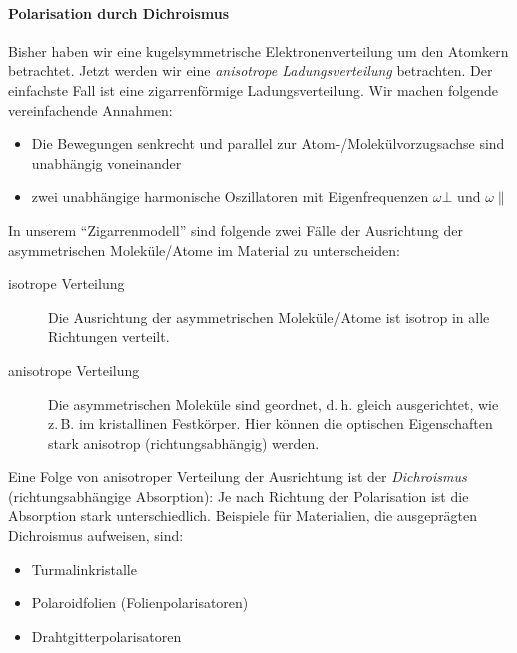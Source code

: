 
\paragraph{Polarisation durch Dichroismus}
Bisher haben wir eine kugelsymmetrische Elektronenverteilung um den
Atomkern betrachtet. Jetzt werden wir eine \emph{anisotrope
Ladungsverteilung} betrachten. Der einfachste Fall ist eine
zigarrenförmige Ladungsverteilung.
Wir machen folgende vereinfachende Annahmen:
\begin{itemize}
\item Die Bewegungen senkrecht und parallel zur
  Atom-/Molekülvorzugsachse sind unabhängig voneinander 
\item zwei unabhängige harmonische Oszillatoren mit Eigenfrequenzen
$\omega\bot$%
und $\omega\parallel$%
\end{itemize}
In unserem \enquote{Zigarrenmodell} sind folgende zwei Fälle der
Ausrichtung der asymmetrischen Moleküle/Atome im Material zu
unterscheiden:
\begin{description}
\item[isotrope Verteilung] Die Ausrichtung der asymmetrischen
  Moleküle/Atome ist isotrop in alle Richtungen verteilt.
\item[anisotrope Verteilung] Die asymmetrischen Moleküle
  sind geordnet, d.\,h. gleich ausgerichtet, wie z.\,B. im
  kristallinen Festkörper. Hier können die optischen Eigenschaften
  stark anisotrop (richtungsabhängig) werden.
\end{description}
Eine Folge von anisotroper Verteilung der Ausrichtung ist der
\emph{Dichroismus} (richtungsabhängige Absorption):
Je nach Richtung der Polarisation ist die Absorption stark
unterschiedlich.
Beispiele für Materialien, die ausgeprägten Dichroismus aufweisen,
sind:
\begin{itemize}
\item Turmalinkristalle
\item Polaroidfolien (Folienpolarisatoren)
\item Drahtgitterpolarisatoren
\end{itemize}

